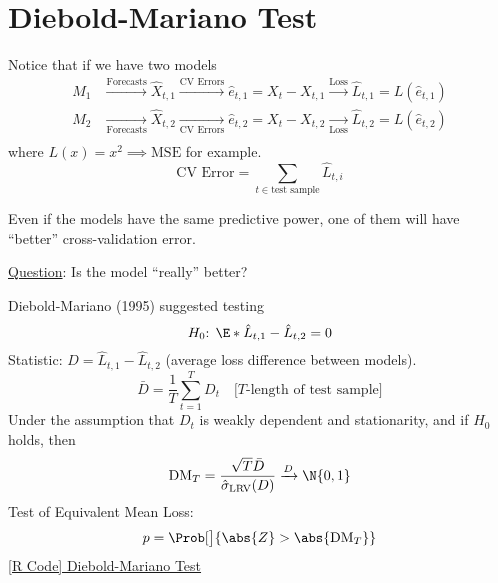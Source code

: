 \section{Diebold-Mariano Test}
Notice that if we have two models
\begin{align*}
    M_1 & \xrightarrow{\text{Forecasts}} \hat{X}_{t,1} \xrightarrow{\text{CV Errors}} \hat{e}_{t,1}=X_t-X_{t,1} \xrightarrow{\text{Loss}} \hat{L}_{t,1}=L(\hat{e}_{t,1})     \\
    M_2 & \xrightarrow[\text{Forecasts}]{}\hat{X}_{t,2}\xrightarrow[\text{CV Errors}]{} \hat{e}_{t,2}=X_t-X_{t,2} \xrightarrow[\text{Loss}]{} \hat{L}_{t,2}=L(\hat{e}_{t,2}) \\
\end{align*}
where $ L(x)=x^2 \implies \text{MSE} $ for example.
\[ \text{CV Error}=\sum_{t\in\text{test sample}}\hat{L}_{t,i}  \]
\begin{Remark}{}{}
    Even if the models have the same predictive power, one of them will have ``better''
    cross-validation error.

    \underline{Question}: Is the model ``really'' better?
\end{Remark}
Diebold-Mariano (1995) suggested testing
\[ \text{$H_0$: }\E*{\hat{L}_{t,1}-\hat{L}_{t,2}}=0 \]
Statistic: $ D=\hat{L}_{t,1}-\hat{L}_{t,2} $ (average loss difference between models).
\[ \bar{D}=\frac{1}{T} \sum_{t=1}^{T} D_t\quad\text{[$T$-length of test sample]} \]
Under the assumption that $ D_t $ is weakly dependent and stationarity, and if $ H_0 $
holds, then
\[ \text{DM}_T=\frac{\sqrt{T}\bar{D}}{\hat{\sigma}_{\text{LRV}}(D)}\xrightarrow{D}\N{0,1}  \]
Test of Equivalent Mean Loss:
\[ p=\Prob[\big]{\abs{Z}>\abs{\text{DM}_T}} \]
\href{https://github.com/Hextical/university-notes/blob/master/year-3/semester-2/STAT 443/code/10.6 - Diebold Mariano Test.R}{[R Code] Diebold-Mariano Test}
